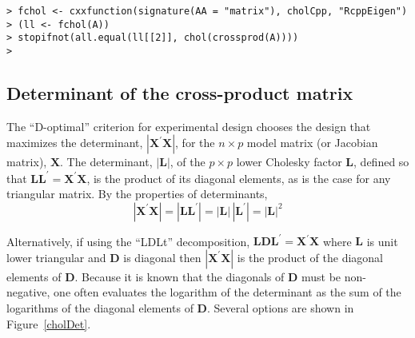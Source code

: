 \documentclass[shortnames,article]{jss}
\begin{document}
\begin{verbatim}
> fchol <- cxxfunction(signature(AA = "matrix"), cholCpp, "RcppEigen")
> (ll <- fchol(A))
> stopifnot(all.equal(ll[[2]], chol(crossprod(A))))
>
\end{verbatim}



\subsection{Determinant of the cross-product matrix}
\label{sec:determinant}

The ``D-optimal'' criterion for experimental design chooses the design
that maximizes the determinant, $|\bm X^\prime\bm X|$, for the
$n\times p$ model matrix (or Jacobian matrix), $\bm X$.  The
determinant, $|\bm L|$, of the $p\times p$ lower Cholesky factor
$\bm L$, defined so that $\bm L\bm L^\prime=\bm X^\prime\bm X$, is
the product of its diagonal elements, as is the case for any
triangular matrix.  By the properties of determinants,
\begin{displaymath}
  |\bm X^\prime\bm X|=|\bm L\bm L^\prime|=|\bm L|\,|\bm L^\prime|=|\bm L|^2
\end{displaymath}

Alternatively, if using the ``LDLt'' decomposition, $\bm L\bm D\bm
L^\prime=\bm X^\prime\bm X$ where $\bm L$ is unit lower triangular and
$\bm D$ is diagonal then $|\bm X^\prime\bm X|$ is the product of the
diagonal elements of $\bm D$.  Because it is known that the diagonals of
$\bm D$ must be non-negative, one often evaluates the logarithm of the
determinant as the sum of the logarithms of the diagonal elements of
$\bm D$.  Several options are shown in Figure~\ref{cholDet}.
\end{document}
